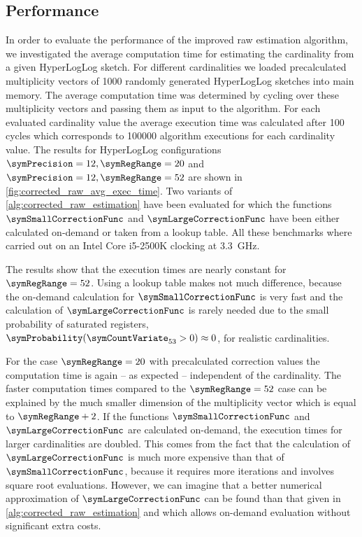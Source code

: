 \documentclass[a4paper]{scrartcl}
\begin{document}
\subsection{Performance}
\label{sec:corrected_raw_estimation_algorithm}
In order to evaluate the performance of the improved raw estimation algorithm, we investigated the average computation time for estimating the cardinality from a given HyperLogLog sketch. For different cardinalities we loaded precalculated multiplicity vectors of \num{1000} randomly generated HyperLogLog sketches into main memory. The average computation time was determined by cycling over these multiplicity vectors and passing them as input to the algorithm. For each evaluated cardinality value the average execution time was calculated after 100 cycles which corresponds to \num{100000} algorithm executions for each cardinality value. The results for HyperLogLog configurations $\symPrecision=12, \symRegRange=20$ and $\symPrecision=12, \symRegRange=52$ are shown in \cref{fig:corrected_raw_avg_exec_time}. Two variants of \cref{alg:corrected_raw_estimation} have been evaluated for which the functions $\symSmallCorrectionFunc$ and $\symLargeCorrectionFunc$ have been either calculated on-demand or taken from a lookup table. All these benchmarks where carried out on an Intel Core i5-2500K clocking at \SI{3.3}{\giga\hertz}. 

The results show that the execution times are nearly constant for $\symRegRange=52$. Using a lookup table makes not much difference, because the on-demand calculation for  $\symSmallCorrectionFunc$ is very fast and the calculation of $\symLargeCorrectionFunc$ is rarely needed due to the small probability of saturated registers, $\symProbability(\symCountVariate_{53}>0)\approx 0$, for realistic cardinalities.

For the case $\symRegRange=20$ with precalculated correction values the computation time is again -- as expected -- independent of the cardinality. The faster computation times compared to the $\symRegRange=52$ case can be explained by the much smaller dimension of the multiplicity vector which is equal to $\symRegRange+2$. If the functions $\symSmallCorrectionFunc$ and $\symLargeCorrectionFunc$ are calculated on-demand, the execution times for larger cardinalities are doubled. This comes from the fact that the calculation of $\symLargeCorrectionFunc$ is much more expensive than that of $\symSmallCorrectionFunc$, because it requires more iterations and involves square root evaluations. However, we can imagine that a better numerical approximation of $\symLargeCorrectionFunc$ can be found than that given in \cref{alg:corrected_raw_estimation} and which allows on-demand evaluation without significant extra costs.
\end{document}
